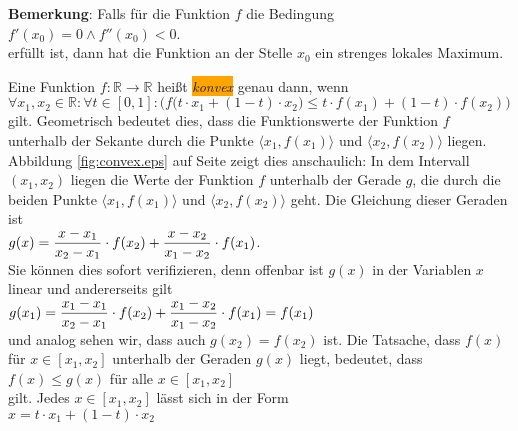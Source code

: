 \noindent
\textbf{Bemerkung}: Falls f\"ur die Funktion $f$ die Bedingung
\\[0.2cm]
\hspace*{1.3cm}
$f'(x_0) = 0 \wedge f''(x_0) < 0$.
\\[0.2cm]
erf\"ullt ist, dann hat die Funktion an der Stelle $x_0$ ein strenges lokales Maximum. \eox


\begin{Definition}
Eine Funktion $f:\mathbb{R} \rightarrow \mathbb{R}$ hei{\ss}t \colorbox{orange}{\emph{konvex}} genau dann, wenn 
\\[0.2cm]
\hspace*{1.3cm}
$\forall x_1,x_2 \in \mathbb{R}:\forall t\in [0,1]: \bigl(
  f\bigl(t \cdot x_1 + (1-t)\cdot x_2\bigr) \leq t \cdot f(x_1) + (1 - t) \cdot f(x_2)
  \bigr)
$
\\[0.2cm]
gilt.  Geometrisch bedeutet dies, dass die Funktionswerte der Funktion $f$  unterhalb
der Sekante durch die Punkte 
$\bigl\langle x_1, f(x_1) \bigl\rangle$ und $\bigl\langle x_2, f(x_2) \bigl\rangle$
liegen.  Abbildung \ref{fig:convex.eps} auf Seite \pageref{fig:convex.eps} zeigt dies anschaulich: 
In dem Intervall $(x_1,x_2)$ liegen die Werte der Funktion $f$ unterhalb der Gerade $g$, die durch die beiden Punkte 
$\langle x_1, f(x_1)\rangle$ und $\langle x_2, f(x_2)\rangle$ geht.  Die Gleichung dieser Geraden
ist 
\\[0.2cm]
\hspace*{1.3cm}
$\displaystyle g(x) = \frac{x-x_1}{x_2-x_1}\cdot f(x_2) + \frac{x-x_2}{x_1-x_2}\cdot f(x_1)$.
\\[0.2cm]
Sie k\"onnen dies sofort verifizieren, denn offenbar ist $g(x)$ in der Variablen $x$ linear und
andererseits gilt
\\[0.2cm]
\hspace*{1.3cm}
$\displaystyle g(x_1) = \frac{x_1-x_1}{x_2-x_1}\cdot f(x_2)+\frac{x_1-x_2}{x_1-x_2}\cdot f(x_1) = f(x_1)$
\\[0.2cm]
und analog sehen wir, dass auch $g(x_2) = f(x_2)$ ist.  Die Tatsache, dass $f(x)$ f\"ur $x \in [x_1,x_2]$
unterhalb der Geraden $g(x)$ liegt, bedeutet, dass
\\[0.2cm]
\hspace*{1.3cm}
$f(x) \leq g(x)$  \quad f\"ur alle $x \in [x_1,x_2]$
\\[0.2cm]
gilt.  Jedes $x \in [x_1,x_2]$ l\"asst sich in der Form
\\[0.2cm]
\hspace*{1.3cm}
$x = t \cdot x_1 + (1-t) \cdot x_2$
\\[0.2cm]

\end{Definition}
